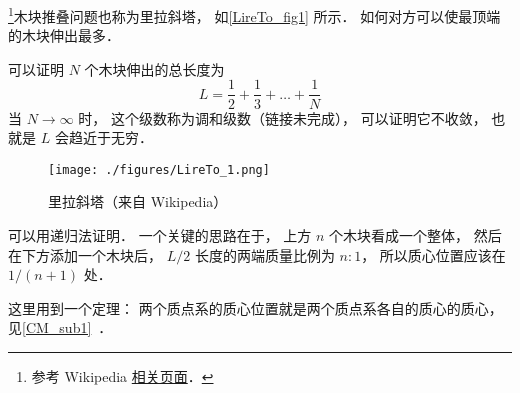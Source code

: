 
\begin{issues}
\issueDraft
\end{issues}


\footnote{参考 Wikipedia \href{https://en.wikipedia.org/wiki/Block-stacking_problem}{相关页面}．}木块推叠问题也称为里拉斜塔， 如\autoref{LireTo_fig1} 所示． 如何对方可以使最顶端的木块伸出最多．

可以证明 $N$ 个木块伸出的总长度为
\begin{equation}
L = \frac{1}{2} + \frac{1}{3} + \dots + \frac{1}{N}
\end{equation}
当 $N\to\infty$ 时， 这个级数称为调和级数（链接未完成）， 可以证明它不收敛， 也就是 $L$ 会趋近于无穷．

\begin{figure}[ht]
\centering
\texttt{[image: ./figures/LireTo\_1.png]}
\caption{里拉斜塔（来自 Wikipedia）} \label{LireTo_fig1}
\end{figure}

可以用递归法证明． 一个关键的思路在于， 上方 $n$ 个木块看成一个整体， 然后在下方添加一个木块后， $L/2$ 长度的两端质量比例为 $n:1$， 所以质心位置应该在 $1/(n+1)$ 处．

这里用到一个定理： 两个质点系的质心位置就是两个质点系各自的质心的质心， 见\autoref{CM_sub1}~．


